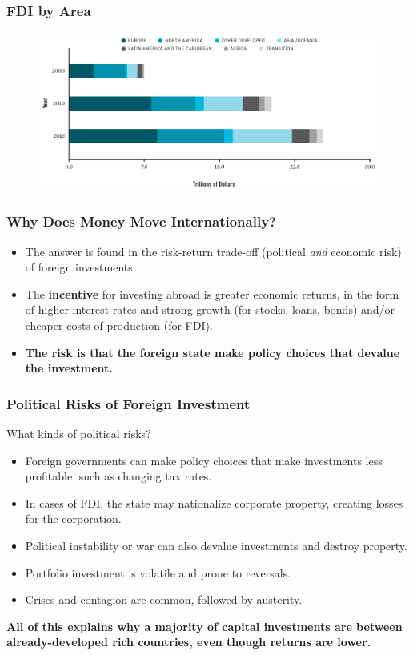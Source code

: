 \documentclass[handout]{beamer}
\begin{document}
\begin{frame} 
\frametitle{\LARGE{FDI by Area}}
\begin{figure}[ht!]
\centering
\includegraphics[width=\textwidth,height=0.8\textheight,keepaspectratio]{./fdiarea.png}
\end{figure}
\end{frame}

\begin{frame} 
	\frametitle{\LARGE{Why Does Money Move Internationally?}}
		\large{
			\begin{itemize}
			    \item The answer is found in the risk-return trade-off (political \textit{and} economic risk) of foreign investments. \pause 
			    \item The \textbf{incentive} for investing abroad is greater economic returns, in the form of higher interest rates and strong growth (for stocks, loans, bonds) and/or cheaper costs of production (for FDI). 
			    \item \textbf{The risk is that the foreign state make policy choices that devalue the investment.}
			\end{itemize}
		}
\end{frame}


\begin{frame} 
	\frametitle{\LARGE{Political Risks of Foreign Investment}}
	What kinds of political risks?
	\begin{itemize}
		\item Foreign governments can make policy choices that make investments less profitable, such as changing tax rates. \pause 
		\item In cases of FDI, the state may nationalize corporate property, creating losses for the corporation. \pause
		\item Political instability or war can also devalue investments and destroy property.
		\item Portfolio investment is volatile and prone to reversals. \pause 
		\item Crises and contagion are common, followed by austerity. \pause 
	\end{itemize}
	\textbf{All of this explains why a majority of capital investments are between already-developed rich countries, even though returns are lower.}
\end{frame}
\end{document}
